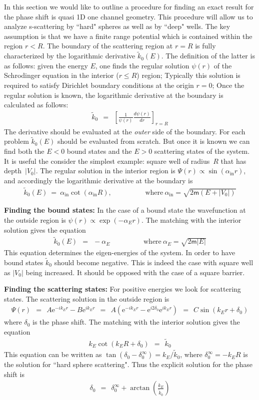 \documentclass[onecolumn,fleqn, 11pt]{revtex4}
\newcommand{\eexp}{\mathrm{e}^}
\newcommand{\mass}{\mathsf{m}}
\newcommand{\beq}{\begin{eqnarray}}
\newcommand{\eeq}{\end{eqnarray}}
\begin{document}
In this section we would like to outline 
a procedure for finding an exact result 
for the phase shift is quasi 1D one channel geometry. 
This procedure will allow us to analyze s-scattering 
by ``hard" spheres as well as by ``deep" wells. 
The key assumption is that we have a finite 
range potential which is contained within 
the region ${r<R}$. The boundary of the scattering 
region at ${r=R}$ is fully characterized by the logarithmic 
derivative $\tilde{k}_{0}(E)$. 
The definition of the latter is as follows: 
given the energy $E$, one finds the regular 
solution $\psi(r)$ of the Schrodinger 
equation in the interior (${r \le R}$) region;  
Typically this solution is required to 
satisfy Dirichlet boundary conditions 
at the origin ${r=0}$; Once the regular solution 
is known, the logarithmic derivative 
at the boundary is calculated as follows:
\beq
\tilde{k}_{0} \ \ = \ \ \left[\frac{1}{\psi(r)}\frac{d\psi(r)}{dr}\right]_{r=R}
\eeq
The derivative should be evaluated  
at the {\em outer} side of the boundary. 
For each problem $\tilde{k}_{0}(E)$
should be evaluated from scratch. 
But once it is known we can find both 
the ${E<0}$ bound states 
and the ${E>0}$ scattering states 
of the system. It is useful the consider the 
simplest example: square well of radius~$R$  
that has depth~$|V_0|$. The regular solution 
in the interior region is ${\Psi(r) \propto \sin(\alpha_{\text{in}} r)}$, 
and accordingly the logarithmic derivative 
at the boundary is 
\beq
\tilde{k}_{0}(E) \ = \ \alpha_{\text{in}} \cot(\alpha_{\text{in}} R), 
\hspace{2cm} \text{where} \ \alpha_{\text{in}}  = \sqrt{2\mass(E+|V_0|)}
\eeq


{\bf Finding the bound states:}
In the case of a bound 
state the wavefunction at the outside 
region is ${\psi(r) \propto \exp(-\alpha_E r)}$. 
The matching with the interior solution  
gives the equation 
\beq
\tilde{k}_{0}(E) \ \ = \ \ -\alpha_E
\hspace{2cm} \text{where} \ \alpha_E  = \sqrt{2\mass|E|}
\eeq
This equation determines the eigen-energies  
of the system. In order to have 
bound states $\tilde{k}_{0}$ should become  
negative. This is indeed the case 
with square well as $|V_0|$ being increased. 
It should be opposed with the case of 
a square barrier.



{\bf Finding the scattering states:}
For positive energies we look 
for scattering states.    
The scattering solution    
in the outside region is 
\beq
\Psi(r) 
\ \ = \ \ 
A\eexp{-ik_Er}-B\eexp{ik_Er} 
\ \ = \ \ 
A (\eexp{-ik_Er}- \eexp{i2\delta_0} \eexp{ik_Er}) 
\ \ =  \ \ 
C \sin(k_Er+\delta_0)
\eeq
where $\delta_0$ is the phase shift.
The matching with the interior solution 
gives the equation 
\beq
k_E\cot(k_ER+\delta_0) \ \ = \ \ \tilde{k}_{0}
\eeq
This equation can be written as 
$\tan(\delta_0-\delta_0^{\infty}) = {k_E}/{\tilde{k}_{0}}$, 
where $\delta_0^{\infty} = -k_ER$ is the solution 
for ``hard sphere scattering". Thus the explicit solution 
for the phase shift is 
\beq
\delta_0 \ \ = \ \ \delta_0^{\infty} + \arctan(\frac{k_E}{\tilde{k}_{0}})
\eeq
\end{document}
